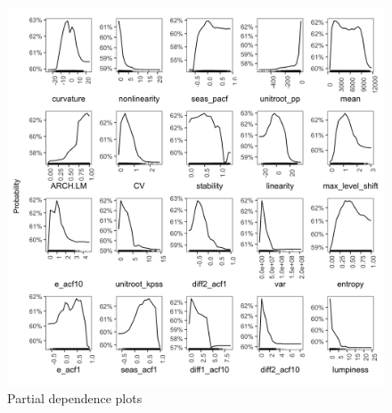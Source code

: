 \documentclass[preprint, 3p,
authoryear]{elsarticle} %
\begin{document}
\begin{figure}[H]

{\centering \includegraphics[width=1\linewidth]{img/300dpi/pfinal} 

}

\caption{Partial dependence plots}\label{fig:pdpcommon1}
\end{figure}
\end{document}
